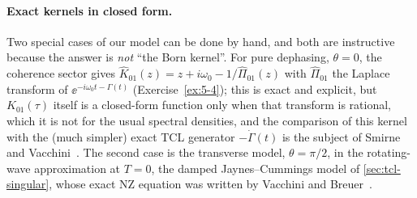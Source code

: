 \paragraph{Exact kernels in closed form.}
Two special cases of our model can be done by hand, and both are instructive because the answer is \emph{not} ``the Born kernel''.
For pure dephasing, $\theta=0$, the coherence sector gives $\hat K_{01}(z)=z+i\omega_0-1/\hat\Pi_{01}(z)$ with $\hat\Pi_{01}$ the Laplace transform of $\ee^{-i\omega_0t-\Gamma(t)}$ (Exercise~\ref{ex:5-4}); this is exact and explicit, but $K_{01}(\tau)$ itself is a closed-form function only when that transform is rational, which it is not for the usual spectral densities, and the comparison of this kernel with the (much simpler) exact TCL generator $-\dot\Gamma(t)$ is the subject of Smirne and Vacchini~\cite{SmirneVacchini2010}.
The second case is the transverse model, $\theta=\pi/2$, in the rotating-wave approximation at $T=0$, the damped Jaynes--Cummings model of \cref{sec:tcl-singular}, whose exact NZ equation was written by Vacchini and Breuer~\cite{Vacchini2010}.

